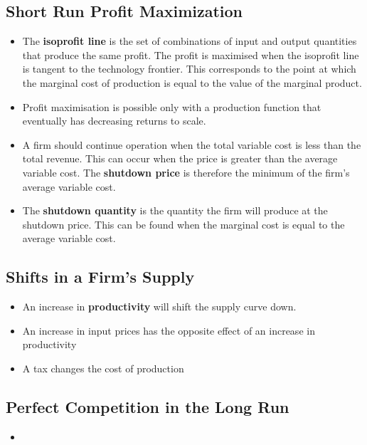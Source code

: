\documentclass[a4paper]{article}
\begin{document}
\subsection{Short Run Profit Maximization}
\begin{itemize}
    \item The \textbf{isoprofit line} is the set of combinations of input and output quantities that produce the same profit. The profit is maximised when the isoprofit line is tangent to the technology frontier. This corresponds to the point at which the marginal cost of production is equal to the value of the marginal product.
    \item Profit maximisation is possible only with a production function that eventually has decreasing returns to scale.
    \item A firm should continue operation when the total variable cost is less than the total revenue. This can occur when the price is greater than the average variable cost. The \textbf{shutdown price} is therefore the minimum of the firm's average variable cost.
    \item The \textbf{shutdown quantity} is the quantity the firm will produce at the shutdown price. This can be found when the marginal cost is equal to the average variable cost.
\end{itemize}

\subsection{Shifts in a Firm's Supply}
\begin{itemize}
    \item An increase in \textbf{productivity} will shift the supply curve down.
    \item An increase in input prices has the opposite effect of an increase in productivity
    \item A tax changes the cost of production
\end{itemize}

\subsection{Perfect Competition in the Long Run}
\begin{itemize}
    \item 
\end{itemize}
\end{document}
